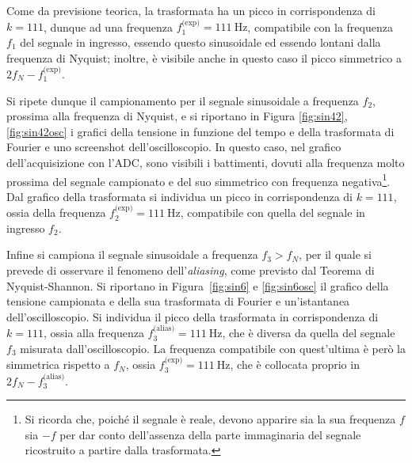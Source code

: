 \documentclass[10pt,oneside,a4paper]{article}
\newenvironment{Figure}
  {\par\medskip\noindent\minipage{\linewidth}}
  {\endminipage\par\medskip}
\begin{document}
\begin{multicols}{2}
Come da previsione teorica, la trasformata ha un picco in corrispondenza di $k=111$, dunque ad una frequenza $f_1^\text{(exp)} = \SI{111}{\Hz}$, compatibile con la frequenza $f_1$ del segnale in ingresso, essendo questo sinusoidale ed essendo lontani dalla frequenza di Nyquist; inoltre, è visibile anche in questo caso il picco simmetrico a $2f_N - f_1^\text{(exp)}$.

Si ripete dunque il campionamento per il segnale sinusoidale a frequenza $f_2$, prossima alla frequenza di Nyquist, e si riportano in Figura \ref{fig:sin42}, \ref{fig:sin42osc} i grafici della tensione in funzione del tempo e della trasformata di Fourier e uno screenshot dell'oscilloscopio. In questo caso, nel grafico dell'acquisizione con l'ADC, sono visibili i battimenti, dovuti alla frequenza molto prossima del segnale campionato e del suo simmetrico con frequenza negativa\footnote{Si ricorda che, poiché il segnale è reale, devono apparire sia la sua frequenza $f$ sia $-f$ per dar conto dell'assenza della parte immaginaria del segnale ricostruito a partire dalla trasformata.}. Dal grafico della trasformata si individua un picco in corrispondenza di $k = 111$, ossia della frequenza $f_2^\text{(exp)} = \SI{111}{\Hz}$, compatibile con quella del segnale in ingresso $f_2$.

%

Infine si campiona il segnale sinusoidale a frequenza $f_3 > f_N$, per il quale si prevede di osservare il fenomeno dell'\emph{aliasing}, come previsto dal Teorema di Nyquist-Shannon. Si riportano in Figura~\ref{fig:sin6} e \ref{fig:sin6osc} il grafico della tensione campionata e della sua trasformata di Fourier e un'istantanea dell'oscilloscopio. Si individua il picco della trasformata in corrispondenza di $k = 111$, ossia alla frequenza $f_3^\text{(alias)} = \SI{111}{\Hz}$, che è diversa da quella del segnale $f_3$ misurata dall'oscilloscopio. La frequenza compatibile con quest'ultima è però la simmetrica rispetto a $f_N$, ossia $f_3^\text{(exp)} = \SI{111}{\Hz}$, che è collocata proprio in $2f_N-f_3^\text{(alias)}$.


\end{multicols}
\end{document}
